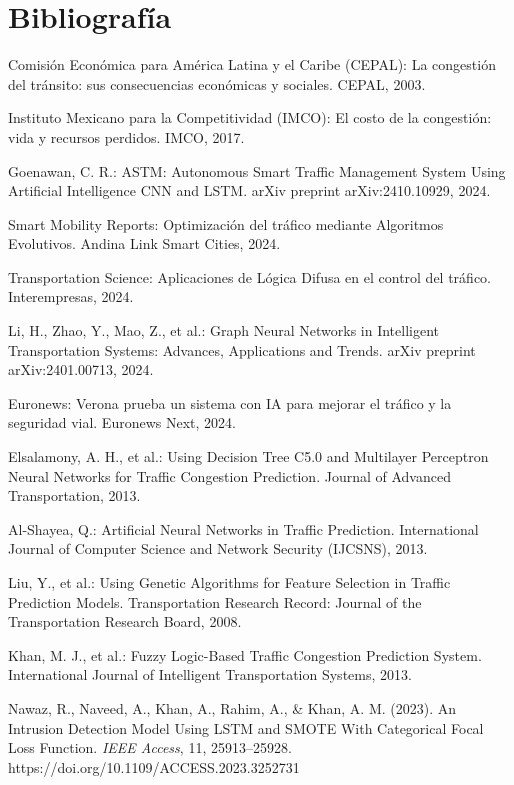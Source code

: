 \documentclass{svproc} %
\begin{document}
\section{Bibliografía}
\begin{thebibliography}{99}

     Comisión Económica para América Latina y el Caribe (CEPAL): La congestión del tránsito: sus consecuencias económicas y sociales. CEPAL, 2003.

     Instituto Mexicano para la Competitividad (IMCO): El costo de la congestión: vida y recursos perdidos. IMCO, 2017.

     Goenawan, C. R.: ASTM: Autonomous Smart Traffic Management System Using Artificial Intelligence CNN and LSTM. arXiv preprint arXiv:2410.10929, 2024.
    
     Smart Mobility Reports: Optimización del tráfico mediante Algoritmos Evolutivos. Andina Link Smart Cities, 2024.
    
     Transportation Science: Aplicaciones de Lógica Difusa en el control del tráfico. Interempresas, 2024.
  
     Li, H., Zhao, Y., Mao, Z., et al.: Graph Neural Networks in Intelligent Transportation Systems: Advances, Applications and Trends. arXiv preprint arXiv:2401.00713, 2024.

     Euronews: Verona prueba un sistema con IA para mejorar el tráfico y la seguridad vial. Euronews Next, 2024.
  
     Elsalamony, A. H., et al.: Using Decision Tree C5.0 and Multilayer Perceptron Neural Networks for Traffic Congestion Prediction. Journal of Advanced Transportation, 2013.
    
     Al-Shayea, Q.: Artificial Neural Networks in Traffic Prediction. International Journal of Computer Science and Network Security (IJCSNS), 2013.
    
     Liu, Y., et al.: Using Genetic Algorithms for Feature Selection in Traffic Prediction Models. Transportation Research Record: Journal of the Transportation Research Board, 2008.
    
     Khan, M. J., et al.: Fuzzy Logic-Based Traffic Congestion Prediction System. International Journal of Intelligent Transportation Systems, 2013.

    Nawaz, R., Naveed, A., Khan, A., Rahim, A., \& Khan, A. M. (2023). 
    An Intrusion Detection Model Using LSTM and SMOTE With Categorical Focal Loss Function. 
    \textit{IEEE Access}, 11, 25913–25928. https://doi.org/10.1109/ACCESS.2023.3252731


\end{thebibliography}
\end{document}
